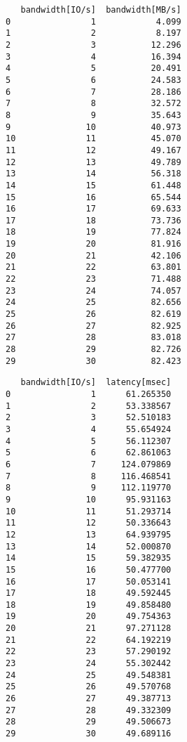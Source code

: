 \documentclass[11pt]{article}
\begin{document}
    
    \begin{verbatim}
   bandwidth[IO/s]  bandwidth[MB/s]
0                1            4.099
1                2            8.197
2                3           12.296
3                4           16.394
4                5           20.491
5                6           24.583
6                7           28.186
7                8           32.572
8                9           35.643
9               10           40.973
10              11           45.070
11              12           49.167
12              13           49.789
13              14           56.318
14              15           61.448
15              16           65.544
16              17           69.633
17              18           73.736
18              19           77.824
19              20           81.916
20              21           42.106
21              22           63.801
22              23           71.488
23              24           74.057
24              25           82.656
25              26           82.619
26              27           82.925
27              28           83.018
28              29           82.726
29              30           82.423
    \end{verbatim}

    
    
    \begin{verbatim}
   bandwidth[IO/s]  latency[msec]
0                1      61.265350
1                2      53.338567
2                3      52.510183
3                4      55.654924
4                5      56.112307
5                6      62.861063
6                7     124.079869
7                8     116.468541
8                9     112.119770
9               10      95.931163
10              11      51.293714
11              12      50.336643
12              13      64.939795
13              14      52.000870
14              15      59.382935
15              16      50.477700
16              17      50.053141
17              18      49.592445
18              19      49.858480
19              20      49.754363
20              21      97.271128
21              22      64.192219
22              23      57.290192
23              24      55.302442
24              25      49.548381
25              26      49.570768
26              27      49.387713
27              28      49.332309
28              29      49.506673
29              30      49.689116
    \end{verbatim}

    
    \begin{center}
    \end{center}
    { \hspace*{\fill} \\}
    
    \begin{center}
    \end{center}
    { \hspace*{\fill} \\}
    

    
    
    
    
\end{document}
